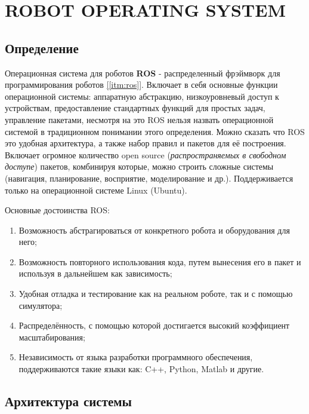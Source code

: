 \chapter{ROBOT OPERATING SYSTEM}

\section{Определение}

Операционная система для роботов \textbf{ROS} - распределенный фрэймворк для программирования роботов \hyperref[itm:ros]{[\ref{itm:ros}]}. Включает в себя основные функции операционной системы: аппаратную абстракцию, низкоуровневый доступ к устройствам, предоставление стандартных функций для простых задач, управление пакетами, несмотря на это ROS нельзя назвать операционной системой в традиционном понимании этого определения. Можно сказать что ROS это удобная архитектура, а также набор правил и пакетов для её построения. Включает огромное количество open source (\textit{распространяемых в свободном доступе}) пакетов, комбинируя которые, можно строить сложные системы (навигация, планирование, восприятие, моделирование и др.). Поддерживается только на операционной системе Linux (Ubuntu).

\vspace{1mm}
Основные достоинства ROS: 

\begin{enumerate}
    \item Возможность абстрагироваться от конкретного робота и оборудования для него;
    \item Возможность повторного использования кода, путем вынесения его в пакет и используя в дальнейшем как зависимость;
    \item Удобная отладка и тестирование как на реальном роботе, так и с помощью симулятора;
    \item Распределённость, с помощью которой достигается высокий коэффициент масштабирования;
    \item Независимость от языка разработки программного обеспечения, поддерживаются такие языки как: C++, Python, Matlab и другие.
\end{enumerate}

\section{Архитектура системы}

